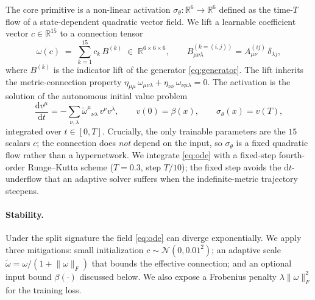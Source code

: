 \documentclass[11pt]{article}
\begin{document}
The core primitive is a non-linear activation $\sigma_\theta:
\mathbb{R}^6 \to \mathbb{R}^6$ defined as the time-$T$ flow of a
state-dependent quadratic vector field. We lift a learnable coefficient
vector $c \in \mathbb{R}^{15}$ to a connection tensor
\begin{equation}
  \omega(c) \;=\; \sum_{k=1}^{15} c_k\, B^{(k)} \;\in\; \mathbb{R}^{6\times6\times6},
  \qquad
  B^{(k=(i,j))}_{\mu\nu\lambda} = A^{(ij)}_{\mu\nu}\,\delta_{\lambda j},
  \label{eq:connection}
\end{equation}
where $B^{(k)}$ is the indicator lift of the generator
\eqref{eq:generator}. The lift inherits the metric-connection property
$\eta_{\mu\mu}\,\omega_{\mu\nu\lambda} + \eta_{\nu\nu}\,\omega_{\nu\mu\lambda}=0$.
The activation is the solution of the autonomous initial value problem
\begin{equation}
  \frac{\mathrm{d}v^\mu}{\mathrm{d}t}
    = -\sum_{\nu,\lambda}
      \tilde\omega^{\mu}{}_{\nu\lambda}\, v^\nu v^\lambda,
  \qquad v(0) = \beta(x),
  \qquad
  \sigma_\theta(x) = v(T),
  \label{eq:ode}
\end{equation}
integrated over $t \in [0,T]$. Crucially, the only trainable parameters
are the $15$ scalars $c$; the connection does \emph{not} depend on the
input, so $\sigma_\theta$ is a fixed quadratic flow rather than a
hypernetwork. We integrate \eqref{eq:ode} with a fixed-step fourth-order
Runge--Kutta scheme ($T=0.3$, step $T/10$); the fixed step avoids the
$\mathrm{d}t$-underflow that an adaptive solver suffers when the
indefinite-metric trajectory steepens.

\paragraph{Stability.} Under the split signature the field
\eqref{eq:ode} can diverge exponentially. We apply three mitigations:
small initialization $c \sim \mathcal{N}(0, 0.01^2)$; an adaptive scale
$\tilde\omega = \omega / (1 + \lVert\omega\rVert_F)$ that bounds the
effective connection; and an optional input bound $\beta(\cdot)$
discussed below. We also expose a Frobenius penalty
$\lambda \lVert\omega\rVert_F^2$ for the training loss.
\end{document}
